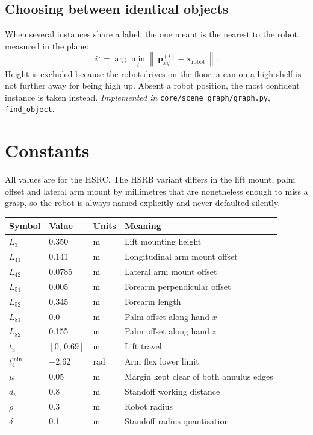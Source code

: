 \documentclass[11pt,a4paper]{article}
\newcommand{\norm}[1]{\left\lVert #1 \right\rVert}
\begin{document}
\subsection{Choosing between identical objects}

When several instances share a label, the one meant is the nearest to the robot,
measured in the plane:
\begin{equation}
i^\star = \arg\min_i \norm{\, \bar{\mathbf{p}}^{(i)}_{xy} - \mathbf{x}_{\text{robot}} \,}.
\end{equation}
Height is excluded because the robot drives on the floor: a can on a high shelf
is not further away for being high up. Absent a robot position, the most
confident instance is taken instead.
\textit{Implemented in} \texttt{core/scene\_graph/graph.py}, \texttt{find\_object}.

\section{Constants}

All values are for the HSRC. The HSRB variant differs in the lift mount, palm
offset and lateral arm mount by millimetres that are nonetheless enough to miss
a grasp, so the robot is always named explicitly and never defaulted silently.

\begin{table}[h]
\centering
\begin{tabular}{llll}
\toprule
Symbol & Value & Units & Meaning \\
\midrule
$L_3$        & 0.350  & m & Lift mounting height \\
$L_{41}$     & 0.141  & m & Longitudinal arm mount offset \\
$L_{42}$     & 0.0785 & m & Lateral arm mount offset \\
$L_{51}$     & 0.005  & m & Forearm perpendicular offset \\
$L_{52}$     & 0.345  & m & Forearm length \\
$L_{81}$     & 0.0    & m & Palm offset along hand $x$ \\
$L_{82}$     & 0.155  & m & Palm offset along hand $z$ \\
$t_3$        & $[0,\,0.69]$    & m   & Lift travel \\
$t_4^{\min}$ & $-2.62$         & rad & Arm flex lower limit \\
$\mu$        & 0.05   & m & Margin kept clear of both annulus edges \\
$d_w$        & 0.8    & m & Standoff working distance \\
$\rho$       & 0.3    & m & Robot radius \\
$\delta$     & 0.1    & m & Standoff radius quantisation \\
\bottomrule
\end{tabular}
\end{table}
\end{document}
